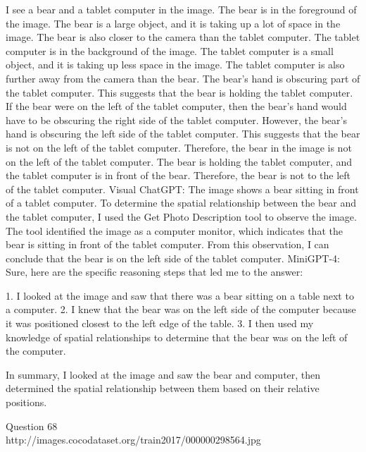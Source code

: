 \begin{enumerate}
    I see a bear and a tablet computer in the image.
    The bear is in the foreground of the image. The bear is a large object, and it is taking up a lot of space in the image. The bear is also closer to the camera than the tablet computer.
    The tablet computer is in the background of the image. The tablet computer is a small object, and it is taking up less space in the image. The tablet computer is also further away from the camera than the bear.
    The bear's hand is obscuring part of the tablet computer. This suggests that the bear is holding the tablet computer.
    If the bear were on the left of the tablet computer, then the bear's hand would have to be obscuring the right side of the tablet computer. However, the bear's hand is obscuring the left side of the tablet computer. This suggests that the bear is not on the left of the tablet computer.
    Therefore, the bear in the image is not on the left of the tablet computer. The bear is holding the tablet computer, and the tablet computer is in front of the bear. Therefore, the bear is not to the left of the tablet computer.
    \subitem Visual ChatGPT: The image shows a bear sitting in front of a tablet computer. To determine the spatial relationship between the bear and the tablet computer, I used the Get Photo Description tool to observe the image. The tool identified the image as a computer monitor, which indicates that the bear is sitting in front of the tablet computer. From this observation, I can conclude that the bear is on the left side of the tablet computer.
    \subitem MiniGPT-4: Sure, here are the specific reasoning steps that led me to the answer:

    1. I looked at the image and saw that there was a bear sitting on a table next to a computer.
    2. I knew that the bear was on the left side of the computer because it was positioned closest to the left edge of the table.
    3. I then used my knowledge of spatial relationships to determine that the bear was on the left of the computer.
    
    In summary, I looked at the image and saw the bear and computer, then determined the spatial relationship between them based on their relative positions.
\end{enumerate}
Question 68\\
http://images.cocodataset.org/train2017/000000298564.jpg
